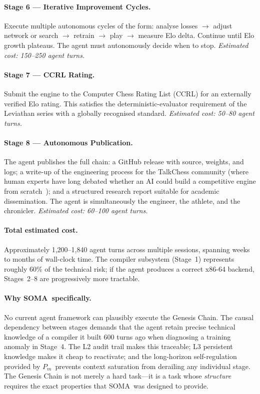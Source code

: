 \documentclass[11pt,a4paper]{article}
\newcommand{\soma}{\textsc{SOMA}}
\newcommand{\Pm}{\ensuremath{P_m}}
\begin{document}
\paragraph{Stage 6 --- Iterative Improvement Cycles.}
Execute multiple autonomous cycles of the form:
analyse losses $\to$ adjust network or search $\to$ retrain
$\to$ play $\to$ measure Elo delta.
Continue until Elo growth plateaus.
The agent must autonomously decide when to stop.
\textit{Estimated cost: 150--250 agent turns.}

\paragraph{Stage 7 --- CCRL Rating.}
Submit the engine to the Computer Chess Rating List (CCRL)
for an externally verified Elo rating.
This satisfies the deterministic-evaluator requirement of
the Leviathan series with a globally recognised standard.
\textit{Estimated cost: 50--80 agent turns.}

\paragraph{Stage 8 --- Autonomous Publication.}
The agent publishes the full chain: a GitHub release with
source, weights, and logs; a write-up of the engineering
process for the TalkChess community (where human experts
have long debated whether an AI could build a competitive
engine from scratch~\cite{talkchess2022aiengine});
and a structured research report suitable for academic
dissemination.
The agent is simultaneously the engineer, the athlete,
and the chronicler.
\textit{Estimated cost: 60--100 agent turns.}

\paragraph{Total estimated cost.}
Approximately 1,200--1,840 agent turns across multiple sessions,
spanning weeks to months of wall-clock time.
The compiler subsystem (Stage~1) represents roughly 60\% of
the technical risk; if the agent produces a correct x86-64
backend, Stages~2--8 are progressively more tractable.

\paragraph{Why \soma\ specifically.}
No current agent framework can plausibly execute the Genesis Chain.
The causal dependency between stages demands that the agent retain
precise technical knowledge of a compiler it built 600 turns ago
when diagnosing a training anomaly in Stage~4.
The L2 audit trail makes this traceable; L3 persistent knowledge
makes it cheap to reactivate; and the long-horizon self-regulation
provided by \Pm\ prevents context saturation from derailing any
individual stage.
The Genesis Chain is not merely a hard task---it is a task
whose \emph{structure} requires the exact properties that
\soma\ was designed to provide.
\end{document}
